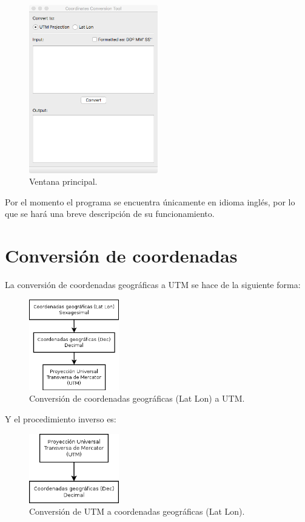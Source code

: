 \documentclass[12pt, letterpaper]{article}
\begin{document}
\begin{figure}[h]
    \centering
    \includegraphics[width=0.5\textwidth]{img/mainwindow.png}
    \caption{Ventana principal.}
    \label{fig:mainwindow}
\end{figure}

Por el momento el programa se encuentra únicamente en idioma inglés, por lo que se hará una breve descripción de su funcionamiento.

\clearpage

\section{Conversión de coordenadas}

La conversión de coordenadas geográficas a UTM se hace de la siguiente forma:

\begin{figure}[h]
    \centering
    \includegraphics[width=0.35\textwidth]{img/geo2utm.png}
    \caption{Conversión de coordenadas geográficas (Lat Lon) a UTM.}
    \label{fig:geo2utm}
\end{figure}

Y el procedimiento inverso es:

\begin{figure}[h]
    \centering
    \includegraphics[width=0.35\textwidth]{img/utm2geo.png}
    \caption{Conversión de UTM a coordenadas geográficas (Lat Lon).}
    \label{fig:utm2geo}
\end{figure}
\end{document}
